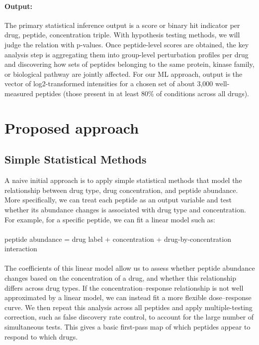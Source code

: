 \paragraph{Output:} The primary statistical inference output is a score or binary hit indicator per drug, peptide, concentration triple. With hypothesis testing methods, we will judge the relation with p-values. Once peptide-level scores are obtained, the key analysis step is aggregating them into group-level perturbation profiles per drug and discovering  how sets of peptides belonging to the same protein, kinase family, or biological pathway are jointly affected. For our ML approach, output is the vector of log2-transformed intensities for a chosen set of about 3,000 well-measured peptides (those present in at least 80\% of conditions across all drugs).


\section{Proposed approach}

\subsection{Simple Statistical Methods}
A naive initial approach is to apply simple statistical methods that model the relationship between drug type, drug concentration, and peptide abundance. More specifically, we can treat each peptide as an output variable and test whether its abundance changes is associated with drug type and concentration. For example, for a specific peptide, we can fit a linear model such as:
\\
\\peptide abundance = drug label + concentration + drug-by-concentration interaction
\\
\\The coefficients of this linear model allow us to assess whether peptide abundance changes based on the concentration of a drug, and whether this relationship differs across drug types. If the concentration–response relationship is not well approximated by a linear model, we can instead fit a more flexible dose–response curve. We then repeat this analysis across all peptides and apply multiple-testing correction, such as false discovery rate control, to account for the large number of simultaneous tests. This gives a basic first-pass map of which peptides appear to respond to which drugs.

